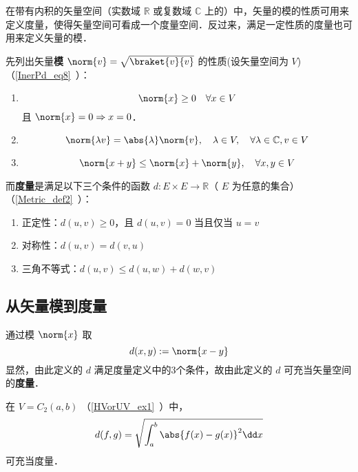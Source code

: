 

在带有内积的矢量空间（实数域 $\mathbb R$ 或复数域 $\mathbb C$ 上的）中，矢量的模的性质可用来定义度量，使得矢量空间可看成一个度量空间．反过来，满足一定性质的度量也可用来定义矢量的模．

先列出矢量\textbf{模} $\norm{v}=\sqrt{\braket{v}{v}}$ 的性质(设矢量空间为 $V$)（\autoref{InerPd_eq8}~）：
\begin{enumerate}
\item 
\begin{equation}\label{SNadM_eq1}
\norm{x}\geq 0\quad \forall x\in V
\end{equation}
且 $\norm{x}=0\Rightarrow x=0$．
\item \begin{equation}\label{SNadM_eq2}
\norm{\lambda v}=\abs{\lambda}\norm{v},\quad \lambda\in V,\quad\forall\lambda\in\mathbb C,v\in V
\end{equation}
\item 
\begin{equation}
\norm{x+y}\leq\norm{x}+\norm{y},\quad \forall x,y\in V
\end{equation}
\end{enumerate}

而\textbf{度量}是满足以下三个条件的函数 $d:E\times E\rightarrow\mathbb R$（ $E$ 为任意的集合）（\autoref{Metric_def2}~）：
\begin{enumerate}
\item 正定性：$d(u, v) \geq 0$，且 $d(u, v)=0$ 当且仅当 $u=v$
\item 对称性：$d(u, v) = d(v, u)$
\item 三角不等式：$d(u, v) \leqslant d(u, w) + d(w, v)$
\end{enumerate}
\subsection{从矢量模到度量}
通过模 $\norm{x}$ 取
\begin{equation}
d(x,y):=\norm{x-y}
\end{equation}
显然，由此定义的 $d$ 满足度量定义中的3个条件，故由此定义的 $d$ 可充当矢量空间的\textbf{度量}．
\begin{example}{}
在 $V=C_2(a,b)$ （\autoref{HVorUV_ex1}~）中，
\begin{equation}
d(f,g)=\sqrt{\int_a^b\abs{f(x)-g(x)}^2\dd x}
\end{equation}
可充当度量．
\end{example}
